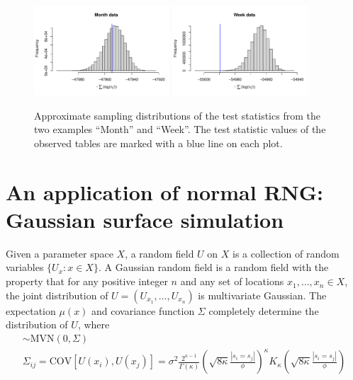 \documentclass[article,nojss]{jss}\usepackage[]{graphicx}\usepackage[]{color}
\makeatletter
\newenvironment{kframe}{%
 \def\at@end@of@kframe{}%
 \ifinner\ifhmode%
  \def\at@end@of@kframe{\end{minipage}}%
  \begin{minipage}{\columnwidth}%
 \fi\fi%
 \def\FrameCommand##1{\hskip\@totalleftmargin \hskip-\fboxsep
 \colorbox{shadecolor}{##1}\hskip-\fboxsep
     \hskip-\linewidth \hskip-\@totalleftmargin \hskip\columnwidth}%
 \MakeFramed {\advance\hsize-\width
   \@totalleftmargin\z@ \linewidth\hsize
   \@setminipage}}%
 {\par\unskip\endMakeFramed%
 \at@end@of@kframe}
\newenvironment{knitrout}{}{} %
\def\cov{{\text{COV}}}
\makeatother
\begin{document}
\begin{figure}[H]
\centering
\begin{knitrout}
\color{fgcolor}\begin{kframe}

\includegraphics[width=0.45\textwidth]{figure/fighistMonth-1} \includegraphics[width=0.45\textwidth]{figure/fighistMonth-2} \end{kframe}
\end{knitrout}
\caption{Approximate sampling distributions of the test statistics from the two examples ``Month'' and ``Week''. The test statistic values of the observed tables are marked with a blue line on each plot. \label{fig4}}
\end{figure}







\section{An application of normal RNG: Gaussian surface simulation} 
Given a parameter space $X$, a random field $U$ on $X$ is a collection of random variables $\{U_x :x\in X\}$. A Gaussian random field is a random field with the property that for any positive integer $n$ and any set of locations $x_1,\dots,x_n \in X$, the joint distribution of $U=(U_{x_1},\dots,U_{x_n})$ is multivariate Gaussian. The expectation $\mu(x)$ and covariance function $\Sigma$ completely determine the distribution of $U$, where 
\begin{gather*} 
[U(s_1) \ldots U(s_N)] \sim \text{MVN}(0, \Sigma) \\
\Sigma_{ij} = \cov[ U(x_i),U(x_j) ] = \sigma^2 \frac{2^{\kappa-1}}{\Gamma(\kappa)} \left(\sqrt{8\kappa} \frac{|s_i = s_j|}{\phi}\right)^\kappa  K_\kappa\left(\sqrt{8\kappa}  \frac{|s_i = s_j|}{\phi}\right)
\end{gather*}
\end{document}
